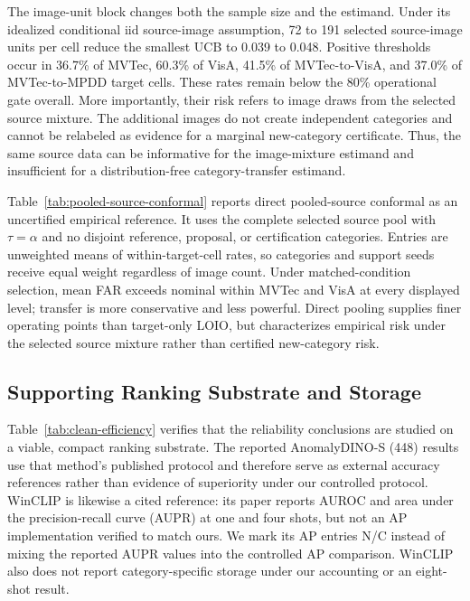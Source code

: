 The image-unit block changes both the sample size and the estimand. Under its idealized conditional iid source-image assumption, 72 to 191 selected source-image units per cell reduce the smallest UCB to 0.039 to 0.048. Positive thresholds occur in 36.7\% of MVTec, 60.3\% of VisA, 41.5\% of MVTec-to-VisA, and 37.0\% of MVTec-to-MPDD target cells. These rates remain below the 80\% operational gate overall. More importantly, their risk refers to image draws from the selected source mixture. The additional images do not create independent categories and cannot be relabeled as evidence for a marginal new-category certificate. Thus, the same source data can be informative for the image-mixture estimand and insufficient for a distribution-free category-transfer estimand.

Table~\ref{tab:pooled-source-conformal} reports direct pooled-source conformal as an uncertified empirical reference. It uses the complete selected source pool with $\tau=\alpha$ and no disjoint reference, proposal, or certification categories. Entries are unweighted means of within-target-cell rates, so categories and support seeds receive equal weight regardless of image count. Under matched-condition selection, mean FAR exceeds nominal within MVTec and VisA at every displayed level; transfer is more conservative and less powerful. Direct pooling supplies finer operating points than target-only LOIO, but characterizes empirical risk under the selected source mixture rather than certified new-category risk.

\subsection{Supporting Ranking Substrate and Storage}


Table~\ref{tab:clean-efficiency} verifies that the reliability conclusions are studied on a viable, compact ranking substrate. The reported AnomalyDINO-S (448) results use that method's published protocol and therefore serve as external accuracy references rather than evidence of superiority under our controlled protocol. WinCLIP is likewise a cited reference: its paper reports AUROC and area under the precision-recall curve (AUPR) at one and four shots, but not an AP implementation verified to match ours. We mark its AP entries N/C instead of mixing the reported AUPR values into the controlled AP comparison. WinCLIP also does not report category-specific storage under our accounting or an eight-shot result.

